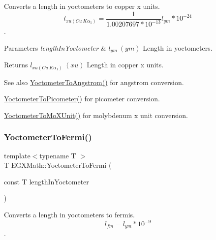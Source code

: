 Converts a length in yoctometers to copper x units. \[ l_{xu(Cu\ K\alpha_1)}= \frac{1}{1.00207697*10^{-13}} l_{ym} * 10^{-24}\]. 


\begin{DoxyParams}{Parameters}
{\em length\+In\+Yoctometer} & $ l_{ym}\ (ym)$ Length in yoctometers. \\
\hline
\end{DoxyParams}
\begin{DoxyReturn}{Returns}
$ l_{xu(Cu\ K\alpha_1)}\ (xu)$ Length in copper x units. 
\end{DoxyReturn}
\begin{DoxySeeAlso}{See also}
\mbox{\hyperlink{group___e_g_x_math-_conversions-_length_conversions-_s_i-_yoctometer-_non-_s_i_ga1189896c419175e90e23cea9d8f6b52a}{Yoctometer\+To\+Angstrom()}} for angstrom conversion. 

\mbox{\hyperlink{group___e_g_x_math-_conversions-_length_conversions-_s_i-_yoctometer-_s_i_gab621b78b78d6776131912bd6038901b9}{Yoctometer\+To\+Picometer()}} for picometer conversion. 

\mbox{\hyperlink{group___e_g_x_math-_conversions-_length_conversions-_s_i-_yoctometer-_non-_s_i_ga6a6a1fb3ecc97e377fc728c03327048e}{Yoctometer\+To\+Mo\+X\+Unit()}} for molybdenum x unit conversion. 
\end{DoxySeeAlso}
\mbox{\label{group___e_g_x_math-_conversions-_length_conversions-_s_i-_yoctometer-_non-_s_i_gadcf3b93b00bf0d160f27d3a1a4b8ed9f}} 
\subsubsection{\texorpdfstring{Yoctometer\+To\+Fermi()}{YoctometerToFermi()}}
{\footnotesize\ttfamily template$<$typename T $>$ \\
T E\+G\+X\+Math\+::\+Yoctometer\+To\+Fermi (\begin{DoxyParamCaption}\item[{const T}]{length\+In\+Yoctometer }\end{DoxyParamCaption})}



Converts a length in yoctometers to fermis. \[ l_{fm}=l_{ym} * 10^{-9} \]. 


